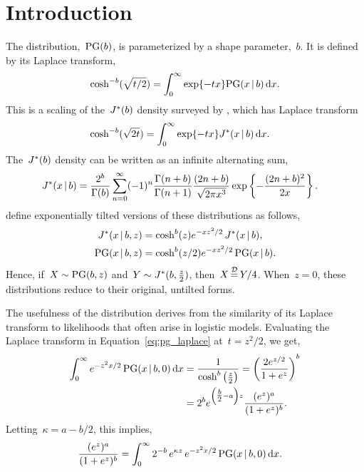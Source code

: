 \documentclass[aos,preprint]{imsart}
\begin{document}
\section{Introduction}
The \polyagamma distribution,~$\mathrm{PG}(b)$, is parameterized
by a shape parameter,~$b$. It is defined by its Laplace transform,
\begin{align}
  \label{eq:pg_laplace}
  \cosh^{-b}(\sqrt{t/2}) = \int_0^\infty \exp\{-tx\} \distPolyaGamma(x \given b) \,\mathrm{d}x.
\end{align}
This is a scaling of the~$J^{*}(b)$ density surveyed by
\citet{biane2001probability}, which has Laplace transform
\begin{align}
  \cosh^{-b}(\sqrt{2t}) &=  \int_{0}^\infty \exp\{-tx\} \distJacobi(x \given b) \, \mathrm{d}x. 
\end{align}
The~$J^{*}(b)$ density can be written as an infinite alternating sum,
\begin{align}
  \distJacobi(x \given b) &= \frac{2^b}{\Gamma(b)}
  \sum_{n=0}^\infty (-1)^n \frac{\Gamma(n+b)}{\Gamma(n+1)} \frac{(2n+b)}{\sqrt{2\pi x^3}}
  \exp\left\{- \frac{(2n+b)^2}{2x} \right\}.
\end{align}
\citet{polson2013bayesian}
define exponentially tilted versions of these distributions as follows,
\begin{align}
  \distJacobi(x \given b, z) &= \cosh^b(z) e^{-xz^2/2} \, \distJacobi(x \given b), \\
  \distPolyaGamma(x \given b, z) &= \cosh^b(z/2) e^{-xz^2/2} \, \distPolyaGamma(x \given b).
\end{align}
Hence, if~$X \sim \mathrm{PG}(b, z)$ and~$Y \sim J^{*}(b, \tfrac{z}{2})$, then~$X \disteq Y/4$. When~$z=0$, these distributions reduce to their original, untilted forms.

The usefulness of the \polyagamma distribution derives from the
similarity of its Laplace transform to likelihoods that often arise in
logistic models. Evaluating the Laplace transform in
Equation~\ref{eq:pg_laplace} at~$t=z^2/2$, we get,
\begin{align}
\int_0^\infty e^{-z^2 x/2} \, \distPolyaGamma(x \given b, 0) \, \mathrm{d}x 
  &= \frac{1} {\cosh^b \left( \frac{z}{2} \right) } 
   = \left(\frac{2e^{z/2}}{1+e^{z}}\right)^b \\
  &= 2^b e^{\left(\tfrac{b}{2}-a \right)z} \frac{(e^z)^{a}}{(1+e^z)^b}. 
\end{align}
Letting~$\kappa = a-b/2$, this implies,
\begin{align}
\label{eq:pg_identity}
\frac{(e^z)^{a}}{(1+e^z)^{b}} &= \int_0^\infty  2^{-b} \, e^{\kappa z} \,
 e^{-z^2 x/2} \, \distPolyaGamma(x \given b, 0) \, \mathrm{d}x .
\end{align}
\end{document}
